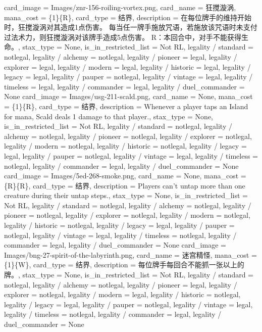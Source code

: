 \documentclass[lang = cn, color = black, 10pt]{AllThatStax}
\begin{document}
\card
{
	card_image = Images/znr-156-roiling-vortex.png,
	card_name = 狂搅漩涡,
	mana_cost = \{1\}\{R\},
	card_type = 结界,
	description = 在每位牌手的维持开始时，狂搅漩涡对其造成1点伤害。
	每当任一牌手施放咒语，若施放该咒语时未支付过法术力，则狂搅漩涡对该牌手造成5点伤害。
	{R}：本回合中，对手不能获得生命。,
	stax_type = None,
	is_in_restricted_list = Not RL,
	legality / standard = notlegal,
	legality / alchemy = notlegal,
	legality / pioneer = legal,
	legality / explorer = legal,
	legality / modern = legal,
	legality / historic = legal,
	legality / legacy = legal,
	legality / pauper = notlegal,
	legality / vintage = legal,
	legality / timeless = legal,
	legality / commander = legal,
	legality / duel_commander = None
}
\card
{
	card_image = Images/usg-211-scald.png,
	card_name = None,
	mana_cost = \{1\}\{R\},
	card_type = 结界,
	description = Whenever a player taps an Island for mana, Scald deals 1 damage to that player.,
	stax_type = None,
	is_in_restricted_list = Not RL,
	legality / standard = notlegal,
	legality / alchemy = notlegal,
	legality / pioneer = notlegal,
	legality / explorer = notlegal,
	legality / modern = notlegal,
	legality / historic = notlegal,
	legality / legacy = legal,
	legality / pauper = notlegal,
	legality / vintage = legal,
	legality / timeless = notlegal,
	legality / commander = legal,
	legality / duel_commander = None
}
\card
{
	card_image = Images/5ed-268-smoke.png,
	card_name = None,
	mana_cost = \{R\}\{R\},
	card_type = 结界,
	description = Players can't untap more than one creature during their untap steps.,
	stax_type = None,
	is_in_restricted_list = Not RL,
	legality / standard = notlegal,
	legality / alchemy = notlegal,
	legality / pioneer = notlegal,
	legality / explorer = notlegal,
	legality / modern = notlegal,
	legality / historic = notlegal,
	legality / legacy = legal,
	legality / pauper = notlegal,
	legality / vintage = legal,
	legality / timeless = notlegal,
	legality / commander = legal,
	legality / duel_commander = None
}
\card
{
	card_image = Images/bng-27-spirit-of-the-labyrinth.png,
	card_name = 迷宫精怪,
	mana_cost = \{1\}\{W\},
	card_type = 结界,
	description = 每位牌手每回合不能抓一张以上的牌。,
	stax_type = None,
	is_in_restricted_list = Not RL,
	legality / standard = notlegal,
	legality / alchemy = notlegal,
	legality / pioneer = legal,
	legality / explorer = notlegal,
	legality / modern = legal,
	legality / historic = notlegal,
	legality / legacy = legal,
	legality / pauper = notlegal,
	legality / vintage = legal,
	legality / timeless = notlegal,
	legality / commander = legal,
	legality / duel_commander = None
}
\end{document}
